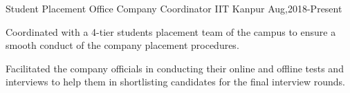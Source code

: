 

\begin{cventries}

  \cventry
  {Student Placement Office}
    {Company Coordinator}
  {IIT Kanpur}
  {Aug,2018-Present}
  {
    \begin{cvitems}
    \item   Coordinated with a 4-tier students placement team of the campus to ensure a smooth conduct of the
            company placement procedures.
    \item   Facilitated the company officials in conducting their online and offline tests and interviews to help them in shortlisting candidates for the final interview rounds.
    \end{cvitems}
  }
  \cventry
 
\end{cventries}

